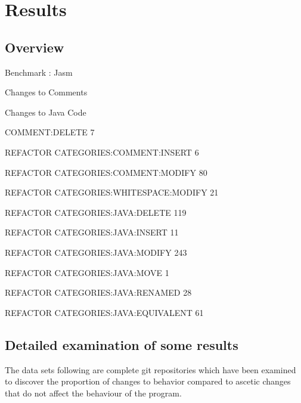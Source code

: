 \section{Results}
\subsection{Overview}
Benchmark : Jasm 

Changes to Comments

Changes to Java Code


COMMENT:DELETE 7

REFACTOR CATEGORIES:COMMENT:INSERT 6

REFACTOR CATEGORIES:COMMENT:MODIFY 80

REFACTOR CATEGORIES:WHITESPACE:MODIFY 21

REFACTOR CATEGORIES:JAVA:DELETE 119

REFACTOR CATEGORIES:JAVA:INSERT 11

REFACTOR CATEGORIES:JAVA:MODIFY 243

REFACTOR CATEGORIES:JAVA:MOVE 1

REFACTOR CATEGORIES:JAVA:RENAMED 28

REFACTOR CATEGORIES:JAVA:EQUIVALENT 61
\subsection{Detailed examination of some results}

The data sets following are complete git repositories which have been examined to discover the proportion of changes to behavior compared to ascetic changes that do not affect the behaviour of the program. 

% 
% 

% 
% 
% 
% 
 
